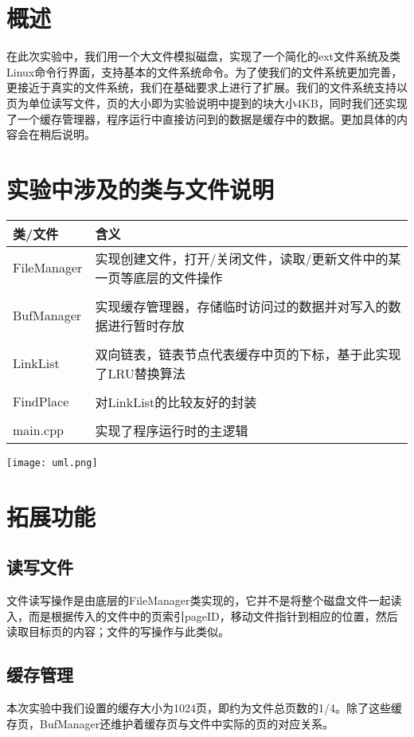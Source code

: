 \section{概述}
在此次实验中，我们用一个大文件模拟磁盘，实现了一个简化的ext文件系统及类Linux命令行界面，支持基本的文件系统命令。为了使我们的文件系统更加完善，更接近于真实的文件系统，我们在基础要求上进行了扩展。我们的文件系统支持以页为单位读写文件，页的大小即为实验说明中提到的块大小4KB，同时我们还实现了一个缓存管理器，程序运行中直接访问到的数据是缓存中的数据。更加具体的内容会在稍后说明。

\section{实验中涉及的类与文件说明}
\begin{center}
    \begin{longtable}{p{}p{}}
        \toprule
        类/文件 & 含义 \\
        \midrule
        FileManager & 实现创建文件，打开/关闭文件，读取/更新文件中的某一页等底层的文件操作\tabularnewline\tabularnewline
        BufManager & 实现缓存管理器，存储临时访问过的数据并对写入的数据进行暂时存放\tabularnewline\tabularnewline
        LinkList & 双向链表，链表节点代表缓存中页的下标，基于此实现了LRU替换算法\tabularnewline\tabularnewline
        FindPlace & 对LinkList的比较友好的封装\tabularnewline\tabularnewline
        main.cpp & 实现了程序运行时的主逻辑\tabularnewline
        \bottomrule
    \end{longtable}
\end{center}

\begin{center}
    \texttt{[image: uml.png]}
\end{center}

\section{拓展功能}

\subsection{读写文件}
文件读写操作是由底层的FileManager类实现的，它并不是将整个磁盘文件一起读入，而是根据传入的文件中的页索引pageID，移动文件指针到相应的位置，然后读取目标页的内容；文件的写操作与此类似。

\subsection{缓存管理}
本次实验中我们设置的缓存大小为1024页，即约为文件总页数的1/4。除了这些缓存页，BufManager还维护着缓存页与文件中实际的页的对应关系。


